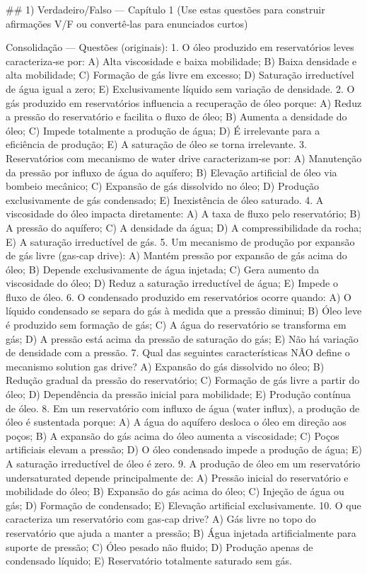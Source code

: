\documentclass[11pt,a4paper]{article}
\begin{document}
\begin{enumerate}
{## 1) Verdadeiro/Falso — Capítulo 1
(Use estas questões para construir afirmações V/F ou convertê‑las para enunciados curtos)

Consolidação — Questões (originais):
1. O óleo produzido em reservatórios leves caracteriza‑se por: A) Alta viscosidade e baixa mobilidade; B) Baixa densidade e alta mobilidade; C) Formação de gás livre em excesso; D) Saturação irreductível de água igual a zero; E) Exclusivamente líquido sem variação de densidade.
2. O gás produzido em reservatórios influencia a recuperação de óleo porque: A) Reduz a pressão do reservatório e facilita o fluxo de óleo; B) Aumenta a densidade do óleo; C) Impede totalmente a produção de água; D) É irrelevante para a eficiência de produção; E) A saturação de óleo se torna irrelevante.
3. Reservatórios com mecanismo de water drive caracterizam‑se por: A) Manutenção da pressão por influxo de água do aquífero; B) Elevação artificial de óleo via bombeio mecânico; C) Expansão de gás dissolvido no óleo; D) Produção exclusivamente de gás condensado; E) Inexistência de óleo saturado.
4. A viscosidade do óleo impacta diretamente: A) A taxa de fluxo pelo reservatório; B) A pressão do aquífero; C) A densidade da água; D) A compressibilidade da rocha; E) A saturação irreductível de gás.
5. Um mecanismo de produção por expansão de gás livre (gas‑cap drive): A) Mantém pressão por expansão de gás acima do óleo; B) Depende exclusivamente de água injetada; C) Gera aumento da viscosidade do óleo; D) Reduz a saturação irreductível de água; E) Impede o fluxo de óleo.
6. O condensado produzido em reservatórios ocorre quando: A) O líquido condensado se separa do gás à medida que a pressão diminui; B) Óleo leve é produzido sem formação de gás; C) A água do reservatório se transforma em gás; D) A pressão está acima da pressão de saturação do gás; E) Não há variação de densidade com a pressão.
7. Qual das seguintes características NÃO define o mecanismo solution gas drive? A) Expansão do gás dissolvido no óleo; B) Redução gradual da pressão do reservatório; C) Formação de gás livre a partir do óleo; D) Dependência da pressão inicial para mobilidade; E) Produção contínua de óleo.
8. Em um reservatório com influxo de água (water influx), a produção de óleo é sustentada porque: A) A água do aquífero desloca o óleo em direção aos poços; B) A expansão do gás acima do óleo aumenta a viscosidade; C) Poços artificiais elevam a pressão; D) O óleo condensado impede a produção de água; E) A saturação irreductível de óleo é zero.
9. A produção de óleo em um reservatório undersaturated depende principalmente de: A) Pressão inicial do reservatório e mobilidade do óleo; B) Expansão do gás acima do óleo; C) Injeção de água ou gás; D) Formação de condensado; E) Elevação artificial exclusivamente.
10. O que caracteriza um reservatório com gas‑cap drive? A) Gás livre no topo do reservatório que ajuda a manter a pressão; B) Água injetada artificialmente para suporte de pressão; C) Óleo pesado não fluido; D) Produção apenas de condensado líquido; E) Reservatório totalmente saturado sem gás.

}
\end{enumerate}
\end{document}
